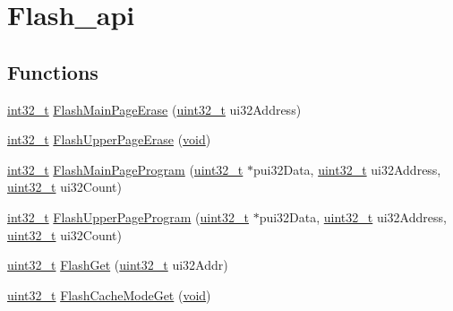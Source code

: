 \hypertarget{group__flash__api}{}\section{Flash\+\_\+api}
\label{group__flash__api}
\subsection*{Functions}
\begin{DoxyCompactItemize}
\item 
\hyperlink{_p_e___types_8h_adb828ef50c2dbb783109824e94cf6c47}{int32\+\_\+t} \hyperlink{group__flash__api_gaedcc8d25fdce7a51b46e6d37629dbef3}{Flash\+Main\+Page\+Erase} (\hyperlink{_p_e___types_8h_a33594304e786b158f3fb30289278f5af}{uint32\+\_\+t} ui32\+Address)
\item 
\hyperlink{_p_e___types_8h_adb828ef50c2dbb783109824e94cf6c47}{int32\+\_\+t} \hyperlink{group__flash__api_ga67d5a1a47713df085c99877079365f04}{Flash\+Upper\+Page\+Erase} (\hyperlink{usb__devapi_8h_afabf60e7f57651d6d595a02c75f07cd0}{void})
\item 
\hyperlink{_p_e___types_8h_adb828ef50c2dbb783109824e94cf6c47}{int32\+\_\+t} \hyperlink{group__flash__api_ga15cabe29d0066e6c37e0ccfd452e6adc}{Flash\+Main\+Page\+Program} (\hyperlink{_p_e___types_8h_a33594304e786b158f3fb30289278f5af}{uint32\+\_\+t} $\ast$pui32\+Data, \hyperlink{_p_e___types_8h_a33594304e786b158f3fb30289278f5af}{uint32\+\_\+t} ui32\+Address, \hyperlink{_p_e___types_8h_a33594304e786b158f3fb30289278f5af}{uint32\+\_\+t} ui32\+Count)
\item 
\hyperlink{_p_e___types_8h_adb828ef50c2dbb783109824e94cf6c47}{int32\+\_\+t} \hyperlink{group__flash__api_ga2a92b46846b2919278a852f0a4b1ffcf}{Flash\+Upper\+Page\+Program} (\hyperlink{_p_e___types_8h_a33594304e786b158f3fb30289278f5af}{uint32\+\_\+t} $\ast$pui32\+Data, \hyperlink{_p_e___types_8h_a33594304e786b158f3fb30289278f5af}{uint32\+\_\+t} ui32\+Address, \hyperlink{_p_e___types_8h_a33594304e786b158f3fb30289278f5af}{uint32\+\_\+t} ui32\+Count)
\item 
\hyperlink{_p_e___types_8h_a33594304e786b158f3fb30289278f5af}{uint32\+\_\+t} \hyperlink{group__flash__api_gaec19050e37101a648c689b3f40d8da90}{Flash\+Get} (\hyperlink{_p_e___types_8h_a33594304e786b158f3fb30289278f5af}{uint32\+\_\+t} ui32\+Addr)
\item 
\hyperlink{_p_e___types_8h_a33594304e786b158f3fb30289278f5af}{uint32\+\_\+t} \hyperlink{group__flash__api_gac9664ecdcf054a53ec8e6d896cc3753c}{Flash\+Cache\+Mode\+Get} (\hyperlink{usb__devapi_8h_afabf60e7f57651d6d595a02c75f07cd0}{void})

\end{DoxyCompactItemize}
